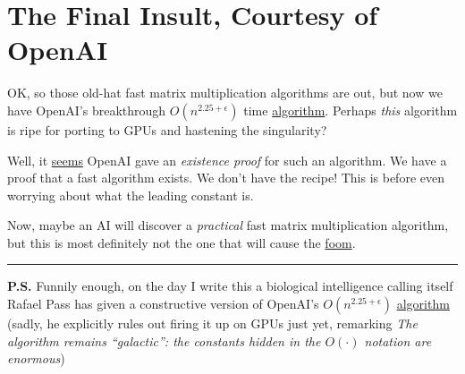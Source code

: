 \documentclass[11pt]{article}
\begin{document}
\section{The Final Insult, Courtesy of OpenAI}

OK, so those old-hat fast matrix multiplication algorithms are out, but now we have OpenAI's breakthrough $O(n^{2.25+\epsilon})$ time \href{https://github.com/openai/math/blob/main/preprints/Matrix-Multiplication-Nine-Fourths-October-2-2026/paper.pdf}{algorithm}. Perhaps \textit{this} algorithm is ripe
for porting to GPUs and hastening the singularity?

Well, it \href{https://www.paradigm3.org/research/mass-math\#complexity-matrix-multiplication-with-exponent-below-237}{seems} OpenAI gave an \textit{existence proof} for such an algorithm.
We have a proof that a fast algorithm exists. We don't have the recipe! This is before even worrying about what the leading constant is.

Now, maybe an AI will discover a \textit{practical} fast matrix multiplication algorithm, but this is most definitely not the one that will cause the \href{https://intelligence.org/files/AIFoomDebate.pdf}{foom}.

\begin{center}
  \rule{0.25\linewidth}{0.4pt}
\end{center}

\noindent\textbf{P.S.} Funnily enough, on the day I write this a biological intelligence calling itself Rafael Pass has given a constructive version of OpenAI's $O(n^{2.25+\epsilon})$ \href{https://arxiv.org/pdf/2610.28627}{algorithm} (sadly, he explicitly rules
out firing it up on GPUs just yet, remarking \textit{The algorithm remains ``galactic'': the constants hidden in the $O(\cdot)$ notation are enormous})
\end{document}
